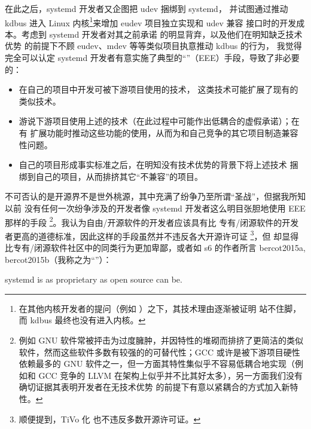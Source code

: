 在此之后，systemd 开发者又企图把 udev 捆绑到 systemd，
并试图通过推动 kdbus 进入 Linux 内核\footnote{在其他内核开发者的提问（例如
\parencite{lutomirski2015}）之下，其技术理由逐渐被证明
站不住脚，而 kdbus 最终也没有进入内核。}来增加 eudev 项目独立实现和 udev 兼容
接口时的开发成本。考虑到 systemd 开发者对其之前承诺%
的明显背弃，以及他们在明知缺乏技术优势%
的前提下不顾 eudev、mdev 等等类似项目执意推动 kdbus 的行为，
我觉得完全可以认定 systemd 开发者有意实施了典型的“”（EEE）手段，导致了非必要的：
\begin{itemize}
\item 在自己的项目中开发可被下游项目使用的技术，
	这类技术可能扩展了现有的类似技术。
\item 游说下游项目使用上述的技术（在此过程中可能作出低耦合的虚假承诺）；在有
	扩展功能时推动这些功能的使用，从而为和自己竞争的其它项目制造兼容性问题。
\item 自己的项目形成事实标准之后，在明知没有技术优势的背景下将上述技术
	捆绑到自己的项目，从而排挤其它“不兼容”的项目。
\end{itemize}
不可否认的是开源界不是世外桃源，其中充满了纷争乃至所谓“圣战”，但据我所知以前
没有任何一次纷争涉及的开发者像 systemd 开发者这么明目张胆地使用 EEE 那样的手段%
\footnote{例如 GNU 软件常被抨击为过度臃肿，并因特性的堆砌而排挤了更简洁的类似
软件，然而这些软件多数有较强的的可替代性；GCC 或许是被下游项目硬性依赖最多的
GNU 软件之一，但一方面其特性集似乎不容易低耦合地实现（例如和 GCC 竞争的 LLVM
在架构上似乎并不比其好太多），另一方面我们没有确切证据其表明开发者在无技术优势
的前提下有意以紧耦合的方式加入新特性。}。我认为自由/开源软件的开发者应该具有比
专有/闭源软件的开发者更高的道德标准，因此这样的手段虽然并不违反各大开源许可证%
\footnote{顺便提到，TiVo 化 也不违反多数开源许可证。}，但
却显得比专有/闭源软件社区中的同类行为更加卑鄙，或者如 s6 的作者所言\cupercite%
{bercot2015a, bercot2015b}（我称之为“”）：
\begin{quoting}
	systemd is as proprietary as open source can be.
\end{quoting}

